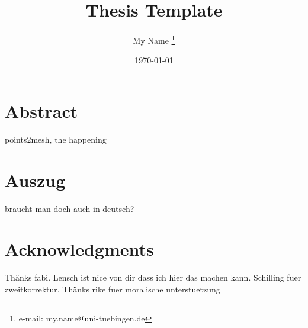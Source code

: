 \documentclass[a4paper,cleardoubleempty,BCOR1cm]{scrbook}
\title{Thesis Template}
\author{My Name \thanks{e-mail: my.name@uni-tuebingen.de}}
\date{\today}
\begin{document}


\chapter*{Abstract}
points2mesh, the happening

\chapter*{Auszug}
braucht man doch auch in deutsch?

\chapter*{Acknowledgments}
Th\"anks fabi. Lensch ist nice von dir dass ich hier das machen kann.
Schilling fuer zweitkorrektur.
Th\"anks rike fuer moralische unterstuetzung


\tableofcontents


















\appendix


%

\end{document}
